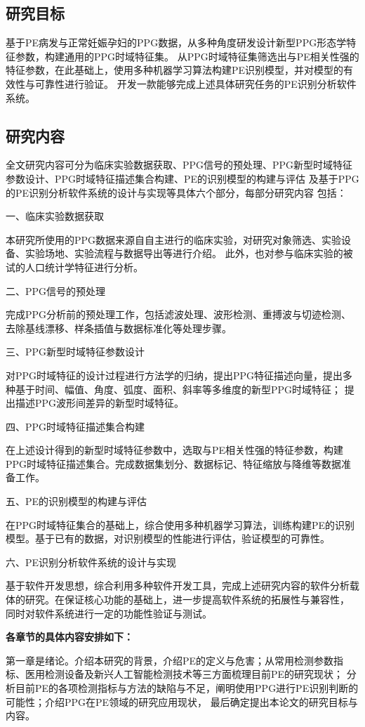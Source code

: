 \subsection{研究目标}
基于PE病发与正常妊娠孕妇的PPG数据，从多种角度研发设计新型PPG形态学特征参数，构建通用的PPG时域特征集。
从PPG时域特征集筛选出与PE相关性强的特征参数，在此基础上，使用多种机器学习算法构建PE识别模型，并对模型的有效性与可靠性进行验证。
开发一款能够完成上述具体研究任务的PE识别分析软件系统。
\subsection{研究内容}
全文研究内容可分为临床实验数据获取、PPG信号的预处理、PPG新型时域特征参数设计、PPG时域特征描述集合构建、PE的识别模型的构建与评估
及基于PPG的PE识别分析软件系统的设计与实现等具体六个部分，每部分研究内容
包括：

一、临床实验数据获取

本研究所使用的PPG数据来源自自主进行的临床实验，对研究对象筛选、实验设备、实验场地、实验流程与数据导出等进行介绍。
此外，也对参与临床实验的被试的人口统计学特征进行分析。

二、PPG信号的预处理

完成PPG分析前的预处理工作，包括滤波处理、波形检测、重搏波与切迹检测、去除基线漂移、样条插值与数据标准化等处理步骤。

三、PPG新型时域特征参数设计

对PPG时域特征的设计过程进行方法学的归纳，提出PPG特征描述向量，提出多种基于时间、幅值、角度、弧度、面积、斜率等多维度的新型PPG时域特征；
提出描述PPG波形间差异的新型时域特征。

四、PPG时域特征描述集合构建

在上述设计得到的新型时域特征参数中，选取与PE相关性强的特征参数，构建PPG时域特征描述集合。完成数据集划分、数据标记、特征缩放与降维等数据准备工作。

五、PE的识别模型的构建与评估

在PPG时域特征集合的基础上，综合使用多种机器学习算法，训练构建PE的识别模型。基于已有的数据，对识别模型的性能进行评估，验证模型的可靠性。

六、PE识别分析软件系统的设计与实现

基于软件开发思想，综合利用多种软件开发工具，完成上述研究内容的软件分析载体的研究。在保证核心功能的基础上，进一步提高软件系统的拓展性与兼容性，
同时对软件系统进行一定的功能性验证与测试。

\textbf{各章节的具体内容安排如下：}

第一章是绪论。介绍本研究的背景，介绍PE的定义与危害；从常用检测参数指标、医用检测设备及新兴人工智能检测技术等三方面梳理目前PE的研究现状；
分析目前PE的各项检测指标与方法的缺陷与不足，阐明使用PPG进行PE识别判断的可能性；介绍PPG在PE领域的研究应用现状，
最后确定提出本论文的研究目标与内容。

